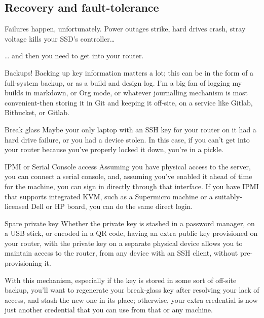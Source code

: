 \documentclass[bigger]{beamer}
\begin{document}
\subsection{Recovery and fault-tolerance}
\label{sec:orgcb67d08}
Failures happen, unfortunately. Power outages strike, hard drives crash,
stray voltage kills your SSD's controller\ldots{}

\ldots{} and then you need to get into your router.

\begin{frame}[label={sec:orgbfa871a}]{Backups!}
Backing up key information matters a lot; this can be in the form of a
full-system backup, or as a build and design log. I'm a big fan of logging
my builds in markdown, or Org mode, or whatever journalling mechanism is
most convenient-then storing it in Git and keeping it off-site, on a service
like Gitlab, Bitbucket, or Gitlab.
\end{frame}

\begin{frame}[label={sec:org48c7f73}]{Break glass}
Maybe your only laptop with an SSH key for your router on it had a hard
drive failure, or you had a device stolen. In this case, if you can't get
into your router because you've properly locked it down, you're in a
pickle.

\begin{block}{IPMI or Serial Console access}
Assuming you have physical access to the server, you can connect a serial
console, and, assuming you've enabled it ahead of time for the machine, you
can sign in directly through that interface. If you have IPMI that supports
integrated KVM, such as a Supermicro machine or a suitably-licensed Dell or
HP board, you can do the same direct login.
\end{block}

\begin{block}{Spare private key}
Whether the private key is stashed in a password manager, on a USB stick,
or encoded in a QR code, having an extra public key provisioned on your
router, with the private key on a separate physical device allows you to
maintain access to the router, from any device with an SSH client, without
pre-provisioning it.

With this mechanism, especially if the key is stored in some sort of
off-site backup, you'll want to regenerate your break-glass key after
resolving your lack of access, and stash the new one in its place;
otherwise, your extra credential is now just another credential that you
can use from that or any machine.
\end{block}
\end{frame}
\end{document}

